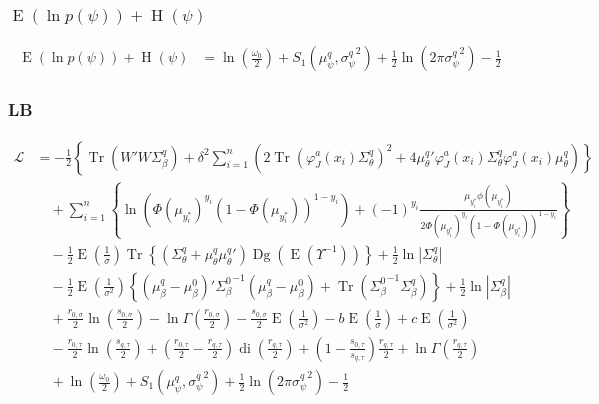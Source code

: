 \documentclass[11pt]{article}
\DeclareMathOperator{\Tr}{Tr}
\newcommand{\opn}{\operatorname}
\begin{document}
\subsubsection{$\opn{E}\left(\ln p\left(\psi\right)\right) + \opn{H}\left(\psi\right)$}
\begin{align*}
  \opn{E}\left(\ln p\left(\psi\right)\right) + \opn{H}\left(\psi\right) &= \ln \left(\frac{\omega_{0}}{2}\right) + S_{1}\left(\mu_{\psi}^{q}, {\sigma_{\psi}^{q}}^{2}\right) + \frac{1}{2}\ln \left(2\pi {\sigma_{\psi}^{q}}^{2}\right) -\frac{1}{2}
\end{align*}
\subsubsection{LB}
  \begin{align*}
    \mathcal{L} &= -\frac{1}{2}\left\{\Tr\left(W'W\Sigma_{\beta}^{q}\right) + \delta^{2}\sum_{i=1}^{n}\left(2\Tr\left(\varphi_{J}^{a}\left(x_{i}\right)\Sigma_{\theta}^{q}\right)^{2} +4{\mu_{\theta}^{q}}'\varphi_{J}^{a}\left(x_{i}\right)\Sigma_{\theta}^{q}\varphi_{J}^{a}\left(x_{i}\right)\mu_{\theta}^{q}\right) \right\}\\
    &\quad + \sum_{i=1}^{n}\left\{\ln\left(\Phi\left(\mu_{y_{i}^{*}}\right)^{y_{i}}\left(1-\Phi\left(\mu_{y_{i}^{*}}\right)\right)^{1-y_{i}}\right) + \left(-1\right)^{y_{i}}\frac{\mu_{y_{i}^{*}}\phi\left(\mu_{y_{i}^{*}}\right)}{2\Phi\left(\mu_{y_{i}^{*}}\right)^{y_{i}}\left(1-\Phi\left(\mu_{y_{i}^{*}}\right)\right)^{1-y_{i}}}\right\}\\
    &\quad -\frac{1}{2}\opn{E}\left(\frac{1}{\sigma}\right)\Tr\left\{\left(\Sigma_{\theta}^{q}+\mu_{\theta}^{q}{\mu_{\theta}^{q}}'\right)\opn{Dg}\left(\opn{E}\left(\Upsilon^{-1}\right)\right) \right\} +\frac{1}{2}\ln\left|\Sigma_{\theta}^{q}\right|\\
    &\quad -\frac{1}{2}\opn{E}\left(\frac{1}{\sigma^{2}}\right)\left\{\left(\mu_{\beta}^{q}-\mu_{\beta}^{0}\right)'{\Sigma_{\beta}^{0}}^{-1}\left(\mu_{\beta}^{q}-\mu_{\beta}^{0}\right) + \Tr\left({\Sigma_{\beta}^{0}}^{-1}\Sigma_{\beta}^{q}\right) \right\} + \frac{1}{2}\ln\left|\Sigma_{\beta}^{q}\right|\\
    &\quad +\frac{r_{0,\sigma}}{2}\ln\left(\frac{s_{0,\sigma}}{2}\right)-\ln\Gamma\left(\frac{r_{0,\sigma}}{2}\right) -\frac{s_{0,\sigma}}{2}\opn{E}\left(\frac{1}{\sigma^{2}}\right) -b\opn{E}\left(\frac{1}{\sigma}\right) +c\opn{E}\left(\frac{1}{\sigma^{2}}\right)\\
    &\quad -\frac{r_{0,\tau}}{2}\ln\left(\frac{s_{q,\tau}}{2}\right) +\left(\frac{r_{0,\tau}}{2} -\frac{r_{q,\tau}}{2}\right)\opn{di}\left(\frac{r_{q,\tau}}{2}\right) +\left(1-\frac{s_{0,\tau}}{s_{q,\tau}}\right)\frac{r_{q,\tau}}{2} +\ln\Gamma\left(\frac{r_{q,\tau}}{2}\right)\\
    &\quad +\ln\left(\frac{\omega_{0}}{2}\right) + S_{1}\left(\mu_{\psi}^{q}, {\sigma_{\psi}^{q}}^{2}\right) + \frac{1}{2}\ln\left(2\pi {\sigma_{\psi}^{q}}^{2}\right) -\frac{1}{2}
  \end{align*}
\end{document}
